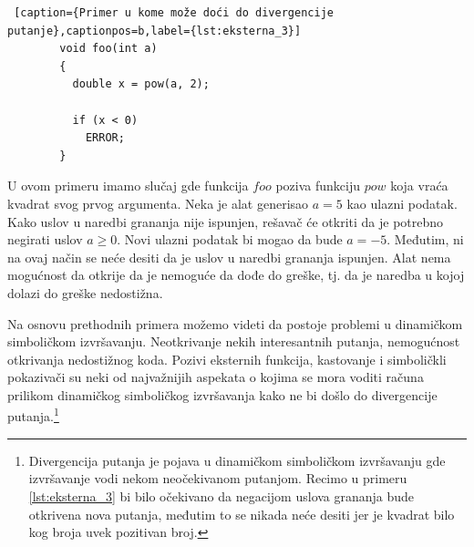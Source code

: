 \documentclass[12pt,oneside]{memoir}
\begin{document}
    \begin{lstlisting} [caption={Primer u kome može doći do divergencije putanje},captionpos=b,label={lst:eksterna_3}]
        void foo(int a)
        {
          double x = pow(a, 2);
          
          if (x < 0)
            ERROR;
        }
    \end{lstlisting}
\bigbreak

U ovom primeru imamo slučaj gde funkcija $foo$ poziva funkciju $pow$ koja vraća kvadrat svog prvog argumenta. Neka je alat generisao $a = 5$ kao ulazni podatak. Kako uslov u naredbi grananja nije ispunjen, rešavač će otkriti da je potrebno negirati uslov $a \geq 0$. Novi ulazni podatak bi mogao da bude $a = -5$. Međutim, ni na ovaj način se neće desiti da je uslov u naredbi grananja ispunjen. Alat nema mogućnost da otkrije da je nemoguće da dođe do greške, tj. da je naredba u kojoj dolazi do greške nedostižna. 

Na osnovu prethodnih primera možemo videti da postoje problemi u dinamičkom simboličkom izvršavanju. Neotkrivanje nekih interesantnih putanja, nemogućnost otkrivanja nedostižnog koda. Pozivi eksternih funkcija, kastovanje i simboličkli pokazivači su neki od najvažnijih aspekata o kojima se mora voditi računa prilikom dinamičkog simboličkog izvršavanja kako ne bi došlo do divergencije putanja.\footnote[2]{Divergencija putanja je pojava u dinamičkom simboličkom izvršavanju gde izvršavanje vodi nekom neočekivanom putanjom. Recimo u primeru \ref{lst:eksterna_3} bi bilo očekivano da negacijom uslova grananja bude otkrivena nova putanja, međutim to se nikada neće desiti jer je kvadrat bilo kog broja uvek pozitivan broj.}
\end{document}
